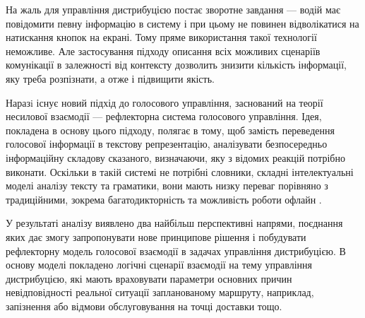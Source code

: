 На жаль для управління дистрибуцією постає зворотне завдання — водій має повідомити певну інформацію в систему і при цьому не повинен відволікатися на натискання кнопок на екрані. Тому пряме використання такої технології неможливе. Але застосування підходу описання всіх можливих сценаріїв комунікації в залежності від контексту дозволить знизити кількість інформації, яку треба розпізнати, а отже і підвищити якість.

Наразi існує новий підхід до голосового управління, заснований на теорії несилової взаємодії \cite{Teslia_2010} — рефлекторна система голосового управління. Ідея, покладена в основу цього підходу, полягає в тому, щоб замість переведення голосової інформації в текстову репрезентацію, аналізувати безпосередньо інформаційну складову сказаного, визначаючи, яку з відомих реакцій потрібно виконати. Оскільки в такій системі не потрібні словники, складні інтелектуальні моделі аналізу тексту та граматики, вони мають низку переваг порівняно з традиційними, зокрема багатодикторність та можливість роботи офлайн \cite{Teslia_2013}.

У результаті аналізу виявлено два найбільш перспективні напрями, поєднання яких дає змогу запропонувати нове принципове рішення і побудувати рефлекторну модель голосової взаємодії в задачах управління дистрибуцією. В основу моделі покладено логічні сценарії взаємодії на тему управління дистрибуцією, які мають враховувати параметри основних причин невідповідності реальної ситуації запланованому маршруту, наприклад, запізнення або відмови обслуговування на точці доставки тощо. 